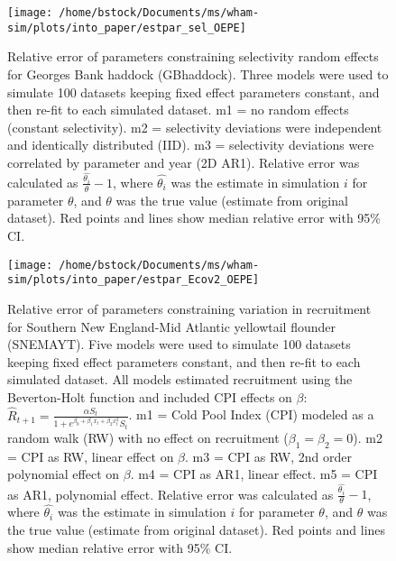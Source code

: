 \documentclass[]{article}
\begin{document}
\begin{figure}

{\centering \texttt{[image: /home/bstock/Documents/ms/wham-sim/plots/into\_paper/estpar\_sel\_OEPE]} 

}

\caption{Relative error of parameters constraining selectivity random effects for Georges Bank haddock (GBhaddock). Three models were used to simulate 100 datasets keeping fixed effect parameters constant, and then re-fit to each simulated dataset. m1 = no random effects (constant selectivity). m2 = selectivity deviations were independent and identically distributed (IID). m3 = selectivity deviations were correlated by parameter and year (2D AR1). Relative error was calculated as $\frac{\hat{\theta_i}}{\theta} - 1$, where $\hat{\theta_i}$ was the estimate in simulation $i$ for parameter $\theta$, and $\theta$ was the true value (estimate from original dataset). Red points and lines show median relative error with 95\% CI.}\label{fig:estpar-sel}
\end{figure}

\pagebreak

\begin{landscape}
\begin{figure}

{\centering \texttt{[image: /home/bstock/Documents/ms/wham-sim/plots/into\_paper/estpar\_Ecov2\_OEPE]} 

}

\caption{Relative error of parameters constraining variation in recruitment for Southern New England-Mid Atlantic yellowtail flounder (SNEMAYT). Five models were used to simulate 100 datasets keeping fixed effect parameters constant, and then re-fit to each simulated dataset. All models estimated recruitment using the Beverton-Holt function and included CPI effects on $\beta$: $\hat{R}_{t+1} = \frac{\alpha S_{t}}{1 + e^{\beta_0 + \beta_1 x_{t} + \beta_2 x^2_{t}} S_t}$. m1 = Cold Pool Index (CPI) modeled as a random walk (RW) with no effect on recruitment ($\beta_1 = \beta_2 = 0$). m2 = CPI as RW, linear effect on $\beta$. m3 = CPI as RW, 2nd order polynomial effect on $\beta$. m4 = CPI as AR1, linear effect. m5 = CPI as AR1, polynomial effect. Relative error was calculated as $\frac{\hat{\theta_i}}{\theta} - 1$, where $\hat{\theta_i}$ was the estimate in simulation $i$ for parameter $\theta$, and $\theta$ was the true value (estimate from original dataset). Red points and lines show median relative error with 95\% CI.}\label{fig:estpar-ecov}
\end{figure}
\end{landscape}
\end{document}
